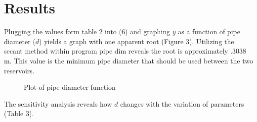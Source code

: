 \documentclass[titlepage,11pt]{article}
\begin{document}
\section{Results}
Plugging the values form table 2 into (6) and graphing $y$ as a
function of pipe diameter ($d$) yields a graph with one apparent
root (Figure 3).  Utilizing the secant method within program pipe
dim reveals the root is approximately .3038 m.  This value is the
minimum pipe diameter that should be used between the two
reservoirs.
\begin{figure}[!h]
\begin{center}
\caption{Plot of pipe diameter function}
\end{center}
\end{figure}

The sensitivity analysis reveals how $d$ changes with the variation
of parameters (Table 3).
\end{document}
